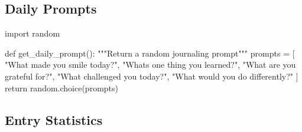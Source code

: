 \documentclass[
  letterpaper,
  DIV=11,
  numbers=noendperiod,
  oneside]{scrreprt}
\newenvironment{Shaded}{}{}
\newcommand{\CommentTok}[1]{\textcolor[rgb]{0.42,0.45,0.49}{#1}}
\newcommand{\ControlFlowTok}[1]{\textcolor[rgb]{0.84,0.23,0.29}{#1}}
\newcommand{\ImportTok}[1]{\textcolor[rgb]{0.01,0.18,0.38}{#1}}
\newcommand{\KeywordTok}[1]{\textcolor[rgb]{0.84,0.23,0.29}{#1}}
\newcommand{\NormalTok}[1]{\textcolor[rgb]{0.14,0.16,0.18}{#1}}
\newcommand{\OperatorTok}[1]{\textcolor[rgb]{0.14,0.16,0.18}{#1}}
\newcommand{\StringTok}[1]{\textcolor[rgb]{0.01,0.18,0.38}{#1}}
\begin{document}
\subsection{Daily Prompts}\label{daily-prompts}

\begin{Shaded}
\begin{Highlighting}[]
\ImportTok{import}\NormalTok{ random}

\KeywordTok{def}\NormalTok{ get\_daily\_prompt():}
    \CommentTok{"""Return a random journaling prompt"""}
\NormalTok{    prompts }\OperatorTok{=}\NormalTok{ [}
        \StringTok{"What made you smile today?"}\NormalTok{,}
        \StringTok{"What\textquotesingle{}s one thing you learned?"}\NormalTok{,}
        \StringTok{"What are you grateful for?"}\NormalTok{,}
        \StringTok{"What challenged you today?"}\NormalTok{,}
        \StringTok{"What would you do differently?"}
\NormalTok{    ]}
    \ControlFlowTok{return}\NormalTok{ random.choice(prompts)}
\end{Highlighting}
\end{Shaded}

\subsection{Entry Statistics}\label{entry-statistics}
\end{document}
